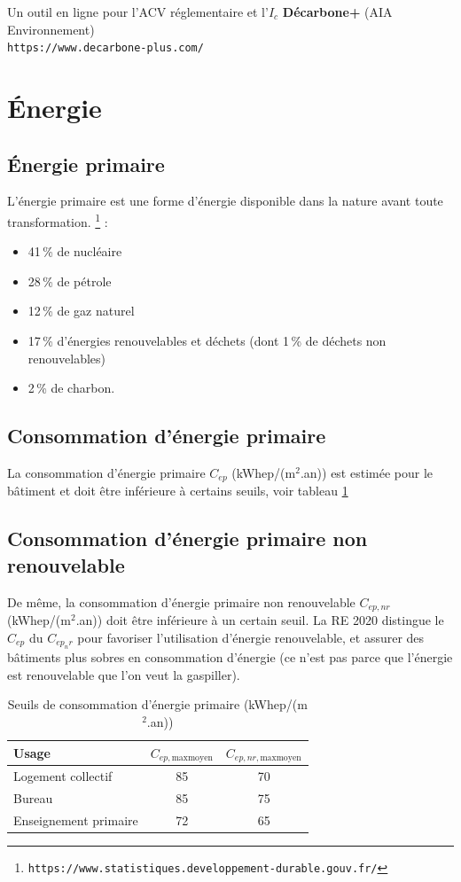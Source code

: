 Un outil en ligne pour l'ACV réglementaire et l'$I_c$ \textbf{Décarbone+} (AIA Environnement)\\
\texttt{https://www.decarbone-plus.com/}

\section{Énergie}

\subsection*{Énergie primaire}
L'énergie primaire est une forme d'énergie disponible dans la nature avant toute transformation.
\footnote{\texttt{https://www.statistiques.developpement-durable.gouv.fr/}} :
\begin{itemize}
  \item 41\,\% de nucléaire
  \item 28\,\% de pétrole
  \item 12\,\% de gaz naturel 
  \item 17\,\% d'énergies renouvelables et déchets (dont 1\,\% de déchets non renouvelables)
  \item 2\,\% de charbon.
\end{itemize}

\subsection*{Consommation d'énergie primaire}
La consommation d'énergie primaire $C_{ep}$ (kWhep/(m$^2$.an)) est estimée pour le bâtiment et doit être inférieure à certains seuils, voir tableau \ref{tab:cep-seuils}

\subsection*{Consommation d'énergie primaire non renouvelable}
De même, la consommation d'énergie primaire non renouvelable $C_{ep,nr}$ (kWhep/(m$^2$.an)) doit être inférieure à un certain seuil. La RE 2020 distingue le $C_{ep}$ du $C_{ep_nr}$ pour favoriser l'utilisation d'énergie renouvelable, et assurer des bâtiments plus sobres en consommation d'énergie (ce n'est pas parce que l'énergie est renouvelable que l'on veut la gaspiller).

\begin{table}[htbp]
\centering
\caption{Seuils de consommation d'énergie primaire (kWhep/(m$^2$.an))}
\label{tab:cep-seuils}
\begin{tabular}{l|c|c}

\textbf{Usage} & \textbf{$C_{ep,\mathrm{maxmoyen}}$} & \textbf{$C_{ep,nr,\mathrm{maxmoyen}}$} \\
\hline
Logement collectif & 85 & 70 \\
Bureau & 85 & 75 \\
Enseignement primaire & 72 & 65 \\

\end{tabular}
\end{table}

